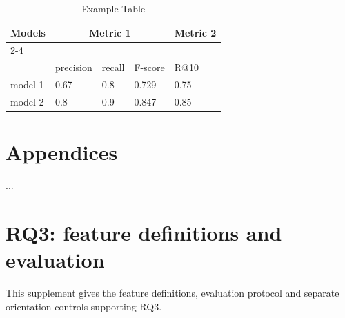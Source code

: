         \begin{table}[h]
            \centering
            \label{tab:example-table}
            \caption{Example Table}
            \begin{tabular}{lllll}
                \toprule
                \multirow{2}{*}{Models} & \multicolumn{3}{c}{Metric 1} & Metric 2\\
                \cmidrule{2-4} \cmidrule{5-5} \\
                {} & precision & recall & F-score  & R@10 \\
                \midrule
                model 1 & 0.67  & 0.8 & 0.729  & 0.75 \\
                model 2 & 0.8 & 0.9 & 0.847 & 0.85 \\
                \bottomrule
            \end{tabular}
        \end{table}


\fi
{}



\clearpage
\onecolumn
\appendix
\section{Appendices}



\begingroup
\let\verbatim\relax
\let\endverbatim\relax
{}


\clearpage

\endgroup

%


%


%




\par\noindent ...\par\medskip
\clearpage
\onecolumn
\section{RQ3: feature definitions and evaluation}\label{app:ton-protocol}
This supplement gives the feature definitions, evaluation protocol and separate orientation controls supporting RQ3.


